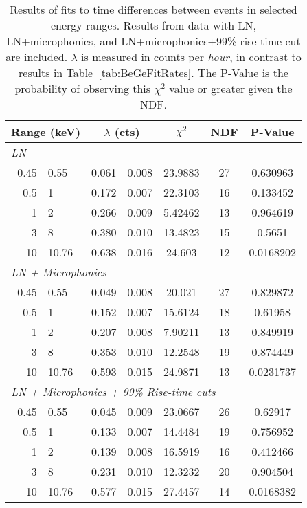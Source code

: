 			\begin{table}
				\centering
				\begin{tabular}{r@{$~\to~$}l  r@{$~\pm~$}l   c  c  c} 
					\toprule
					\multicolumn{2}{c}{Range (keV)} & \multicolumn{2}{c}{$\lambda$ (cts)} & $\chi^2$ & NDF & P-Value \\
					\midrule
					\multicolumn{7}{l}{\emph{LN}} \\ 
					0.45 & 0.55 & 0.061 & 0.008 & 23.9883 & 27 & 0.630963 \\
					0.5 & 1 & 0.172 & 0.007 & 22.3103 & 16 & 0.133452 \\
					1 & 2 & 0.266 & 0.009 & 5.42462 & 13 & 0.964619 \\
					3 & 8 & 0.380 & 0.010 & 13.4823 & 15 & 0.5651 \\
					10 & 10.76 & 0.638 & 0.016 & 24.603 & 12 & 0.0168202 \\
					\midrule
					\multicolumn{7}{l}{\emph{LN + Microphonics}} \\
					0.45 & 0.55 & 0.049 & 0.008 & 20.021 & 27 & 0.829872 \\
					0.5 & 1 & 0.152 & 0.007 & 15.6124 & 18 & 0.61958 \\
					1 & 2 & 0.207 & 0.008 & 7.90211 & 13 & 0.849919 \\
					3 & 8 & 0.353 & 0.010 & 12.2548 & 19 & 0.874449 \\
					10 & 10.76 & 0.593 & 0.015 & 24.9871 & 13 & 0.0231737 \\
					\midrule
					\multicolumn{7}{l}{\emph{LN + Microphonics + 99\% Rise-time cuts}} \\ 
					0.45 & 0.55 & 0.045 & 0.009 & 23.0667 & 26 & 0.62917 \\
					0.5 & 1 & 0.133 & 0.007 & 14.4484 & 19 & 0.756952 \\
					1 & 2 & 0.139 & 0.008 & 16.5919 & 16 & 0.412466 \\
					3 & 8 & 0.231 & 0.010 & 12.3232 & 20 & 0.904504 \\
					10 & 10.76 & 0.577 & 0.015 & 27.4457 & 14 & 0.0168382 \\
					\bottomrule
				\end{tabular}
				\caption[Results of fits to time differences between events in selected energy ranges]
				{Results of fits to time differences between events in selected energy ranges.  Results from data with LN, LN+microphonics, and LN+microphonics+99\% 
				rise-time cut are included.  $\lambda$ is measured in counts per \emph{hour}, in contrast to results in Table~\ref{tab:BeGeFitRates}. 
				The P-Value is the probability of observing this $\chi^{2}$ value or greater given the NDF.}
				\label{tab:BeGeFitExp}
			\end{table}

